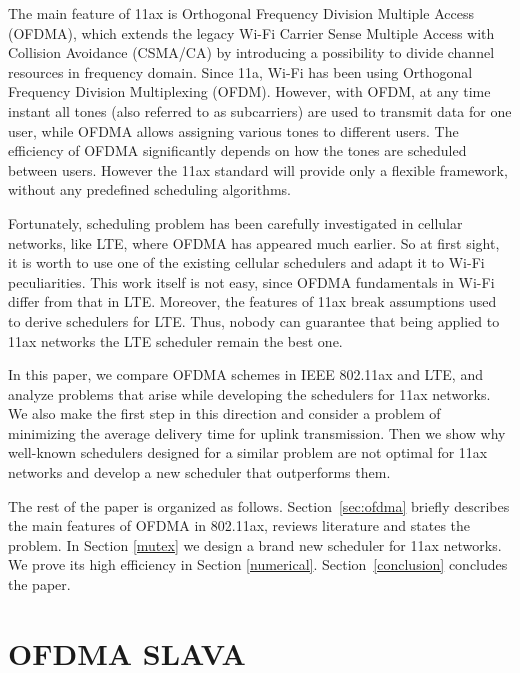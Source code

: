 The main feature of 11ax is Orthogonal Frequency Division Multiple Access (OFDMA), which extends the legacy Wi-Fi Carrier Sense Multiple Access with Collision Avoidance (CSMA/CA) by introducing a possibility to divide channel resources in frequency domain. Since 11a, Wi-Fi has been using Orthogonal Frequency Division Multiplexing (OFDM). However, with OFDM, at any time instant all tones (also referred to as subcarriers) are used to transmit data for one user, while OFDMA allows assigning various tones to different users. The efficiency of OFDMA significantly depends on how the tones are scheduled between users. However the 11ax standard will provide only a flexible framework, without any predefined scheduling algorithms. 

Fortunately, scheduling problem has been carefully investigated in cellular networks, like LTE, where OFDMA has appeared much earlier. So at first sight, it is worth to use one of the existing cellular schedulers and adapt it to Wi-Fi peculiarities. This work itself is not easy, since OFDMA fundamentals in Wi-Fi differ from that in LTE. Moreover, the features of 11ax break assumptions used to derive schedulers for LTE. Thus, nobody can guarantee that being applied to 11ax networks the LTE scheduler remain the best one. 

In this paper, we compare OFDMA schemes in IEEE 802.11ax and LTE, and analyze problems that arise while developing the schedulers for 11ax networks. We also make the first step in this direction and consider a problem of minimizing the average delivery time for uplink transmission. Then we show why well-known schedulers designed for a similar problem are not optimal for 11ax networks and develop a new scheduler that outperforms them. 

The rest of the paper is organized as follows.
Section~\ref{sec:ofdma} briefly describes the main features of OFDMA in 802.11ax, reviews literature and states the problem.
In Section \ref{mutex} we design a brand new scheduler for 11ax networks.
We prove its high efficiency in Section \ref{numerical}.
Section~\ref{conclusion} concludes the paper. 

\section{OFDMA SLAVA}

